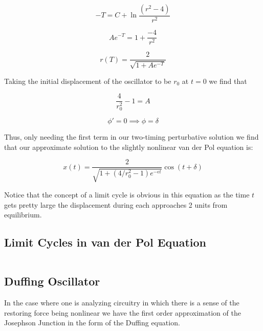 \documentclass[12pt]{article}
\begin{document}
\begin{equation}
-T = C + \ln \dfrac{(r^2-4)}{r^2} 
\end{equation}

\begin{equation}
Ae^{-T} = 1 + \dfrac{-4}{r^2}
\end{equation}

\begin{equation}
r(T)=\dfrac{2}{\sqrt{1 + Ae^{-T}}}
\end{equation}

Taking the initial displacement of the oscillator to be $r_0$ at $t = 0$ we find that

\begin{equation}
\dfrac{4}{r_0^2} - 1 = A
\end{equation}

\begin{equation}
\phi' = 0 \implies \phi = \delta
\end{equation}

Thus, only needing the first term in our two-timing perturbative solution we find that our approximate solution to the slightly nonlinear van der Pol equation is:

\begin{equation}
x(t) = \dfrac{2}{\sqrt{1 + (4/r_0^2 - 1)e^{-\epsilon t}}} \cos(t + \delta)
\end{equation}

Notice that the concept of a limit cycle is obvious in this equation as the time $t$ gets pretty large the displacement during each approaches 2 units from equilibrium.

\subsection{Limit Cycles in van der Pol Equation}

\begin{equation}

\end{equation}


\subsection{Duffing Oscillator}

In the case where one is analyzing circuitry in which there is a sense of the restoring force being nonlinear we have the first order approximation of the Josephson Junction in the form of the Duffing equation.
\end{document}
